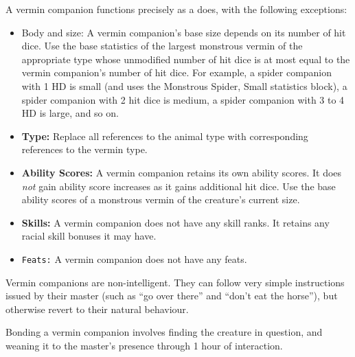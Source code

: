 A vermin companion functions precisely as a  does, with the following exceptions:
\begin{itemize}
 \item Body and size: A vermin companion's base size depends on its number of hit dice. Use the base statistics of the largest monstrous vermin of the appropriate type whose unmodified number of hit dice is at most equal to the vermin companion's number of hit dice. For example, a spider companion with 1 HD is small (and uses the Monstrous Spider, Small statistics block), a spider companion with 2 hit dice is medium, a spider companion with 3 to 4 HD is large, and so on.
 \item \textbf{Type:} Replace all references to the animal type with corresponding references to the vermin type.
 \item \textbf{Ability Scores:} A vermin companion retains its own ability scores.
 It does \emph{not} gain ability score increases as it gains additional hit dice. Use the base ability scores of a monstrous vermin of the creature's current size.
 \item \textbf{Skills:} A vermin companion does not have any skill ranks. It retains any racial skill bonuses it may have. 
 \item \texttt{Feats:} A vermin companion does not have any feats.
\end{itemize}
Vermin companions are non-intelligent. They can follow very simple instructions issued by their master (such as ``go over there'' and ``don't eat the horse''), but otherwise revert to their natural behaviour.

Bonding a vermin companion involves finding the creature in question, and weaning it to the master's presence through 1 hour of interaction.